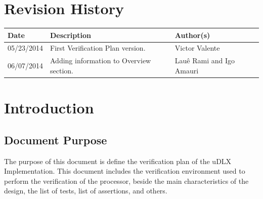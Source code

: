 \documentclass{article}
\begin{document}
  \section*{\center Revision History}
  \vspace*{1cm}
  \begin{center} %
    \begin{longtable}[pos]{|m{2cm} | m{7.2cm} | m{3.8cm}|} 
      \hline %
      \cellcolor[gray]{0.9}
      \textbf{Date} & \cellcolor[gray]{0.9}\textbf{Description} & \cellcolor[gray]{0.9}\textbf{Author(s)}\\ \hline
      \hline
      \small 05/23/2014 & \small First Verification Plan version. & \small Victor Valente \\ \hline
      \small 06/07/2014 & \small Adding information to Overview section. & \small Lauê Rami and Igo Amauri \\ \hline
    \end{longtable}
  \end{center}

  \newpage
  \tableofcontents
  \newpage

  \section{Introduction}

	\subsection{Document Purpose}
	The purpose of this document is define the verification plan of the uDLX Implementation. This document includes the 		verification environment used to perform the verification of the processor, beside the main characteristics of the design, the list of tests, list of assertions, and others.
\end{document}
